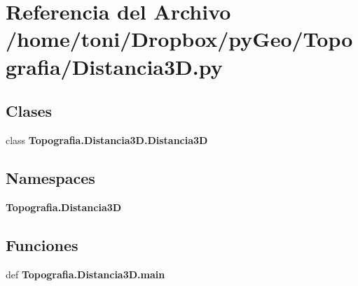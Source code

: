 \section{Referencia del Archivo /home/toni/\-Dropbox/py\-Geo/\-Topografia/\-Distancia3\-D.py}
\label{Distancia3D_8py}
\subsection*{Clases}
\begin{DoxyCompactItemize}
\item 
class {\bf Topografia.\-Distancia3\-D.\-Distancia3\-D}
\end{DoxyCompactItemize}
\subsection*{Namespaces}
\begin{DoxyCompactItemize}
\item 
{\bf Topografia.\-Distancia3\-D}
\end{DoxyCompactItemize}
\subsection*{Funciones}
\begin{DoxyCompactItemize}
\item 
def {\bf Topografia.\-Distancia3\-D.\-main}
\end{DoxyCompactItemize}

